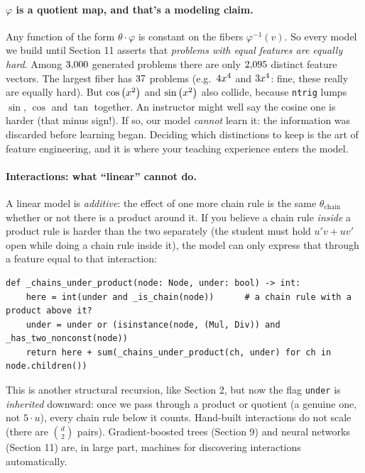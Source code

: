 \documentclass[11pt]{article}
\theoremstyle{definition}
\theoremstyle{plain}
\theoremstyle{remark}
\newcommand{\code}[1]{\texttt{#1}}
\renewcommand{\_}{\oldunderscore\allowbreak}
\newcommand{\file}[1]{\textcolor{blue!50!black}{\texttt{#1}}}
\newcommand{\codefrom}[1]{\par\smallskip\noindent{\footnotesize\textbf{From} \file{#1}}}
\begin{document}
\paragraph{$\varphi$ is a quotient map, and that's a modeling claim.}
Any function of the form $\theta\cdot\varphi$ is constant on the fibers $\varphi^{-1}(v)$. So every
model we build until Section 11 asserts that \emph{problems with equal features are equally hard}. Among
$3{,}000$ generated problems there are only $2{,}095$ distinct feature vectors. The largest fiber
has $37$ problems (e.g.\ $4 x^{4}$ and $3 x^{4}$: fine, these really are equally hard). But
$\cos\left(x^{2}\right)$ and $\sin\left(x^{2}\right)$ also collide, because \code{n\_trig} lumps $\sin$, $\cos$ and $\tan$
together. An instructor might well say the cosine one is harder (that minus sign!). If so, our model
\emph{cannot} learn it: the information was discarded before learning began. Deciding which distinctions
to keep is the art of feature engineering, and it is where your teaching experience enters the model.

\paragraph{Interactions: what ``linear'' cannot do.}
A linear model is \emph{additive}: the effect of one more chain rule is the same $\theta_{\text{chain}}$ whether or not
there is a product around it. If you believe a chain rule \emph{inside} a product rule is harder than the
two separately (the student must hold $u'v+uv'$ open while doing a chain rule inside it), the model can only
express that through a feature equal to that interaction:

\codefrom{src/calcdiff/features.py}
\begin{lstlisting}
def _chains_under_product(node: Node, under: bool) -> int:
    here = int(under and _is_chain(node))      # a chain rule with a product above it?
    under = under or (isinstance(node, (Mul, Div)) and _has_two_nonconst(node))
    return here + sum(_chains_under_product(ch, under) for ch in node.children())
\end{lstlisting}
This is another structural recursion, like Section 2, but now the flag \code{under} is \emph{inherited}
downward: once we pass through a product or quotient (a genuine one, not $5\cdot u$), every chain rule below
it counts. Hand-built interactions do not scale (there are $\binom{d}{2}$ pairs). Gradient-boosted trees (Section 9) and
neural networks (Section 11) are, in large part, machines for discovering interactions automatically.
\end{document}
